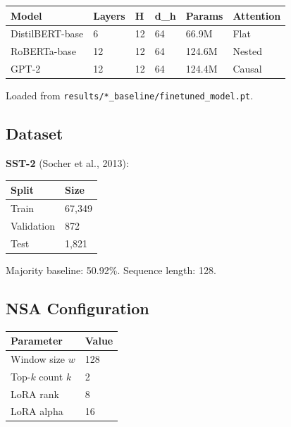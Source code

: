 \begin{table}[H]
\centering
\small
\begin{tabular}{llllll}
\toprule
\textbf{Model} & \textbf{Layers} & \textbf{H} & \textbf{d\_h} & \textbf{Params} & \textbf{Attention} \\
\midrule
DistilBERT-base & 6 & 12 & 64 & 66.9M & Flat \\
RoBERTa-base & 12 & 12 & 64 & 124.6M & Nested \\
GPT-2 & 12 & 12 & 64 & 124.4M & Causal \\
\bottomrule
\end{tabular}
\end{table}

Loaded from \texttt{results/*\_baseline/finetuned\_model.pt}.

\subsection{Dataset}

\textbf{SST-2} (Socher et al., 2013):

\begin{table}[H]
\centering
\small
\begin{tabular}{ll}
\toprule
\textbf{Split} & \textbf{Size} \\
\midrule
Train & 67,349 \\
Validation & 872 \\
Test & 1,821 \\
\bottomrule
\end{tabular}
\end{table}

Majority baseline: 50.92\%. Sequence length: 128.

\subsection{NSA Configuration}

\begin{table}[H]
\centering
\small
\begin{tabular}{ll}
\toprule
\textbf{Parameter} & \textbf{Value} \\
\midrule
Window size $w$ & 128 \\
Top-$k$ count $k$ & 2 \\
LoRA rank & 8 \\
LoRA alpha & 16 \\
\bottomrule
\end{tabular}
\end{table}

